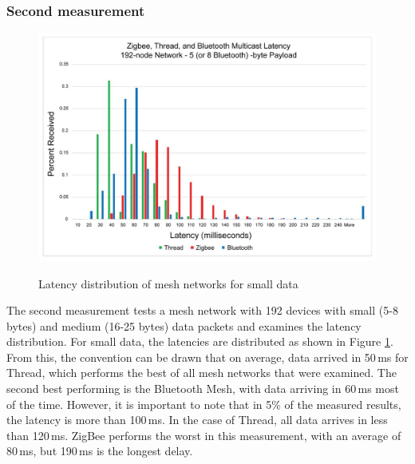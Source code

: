 \subsubsection{Second measurement}
\begin{figure}[!h]
    \centering
    \includegraphics[width=\textwidth]{img/mesh-large-network-small-payload.png}
    \caption{Latency distribution of mesh networks for small data}
    \label{fig:threadsmallload}
    \cite{threadSilabs}
\end{figure}
\noindent
The second measurement tests a mesh network with 192 devices with small (5-8 bytes) and medium (16-25 bytes) data packets and examines the latency distribution.
\newline
For small data, the latencies are distributed as shown in Figure \ref{fig:threadsmallload}. From this, the convention can be drawn that on average, data arrived in 50\,\si{\milli s} for Thread, which performs the best of all mesh networks that were examined. The second best performing is the Bluetooth Mesh, with data arriving in 60\,\si{\milli s} most of the time. However, it is important to note that in 5\% of the measured results, the latency is more than 100\,\si{\milli s}. In the case of Thread, all data arrives in less than 120\,\si{\milli s}. ZigBee performs the worst in this measurement, with an average of 80\,\si{\milli s}, but 190\,\si{\milli s} is the longest delay.

